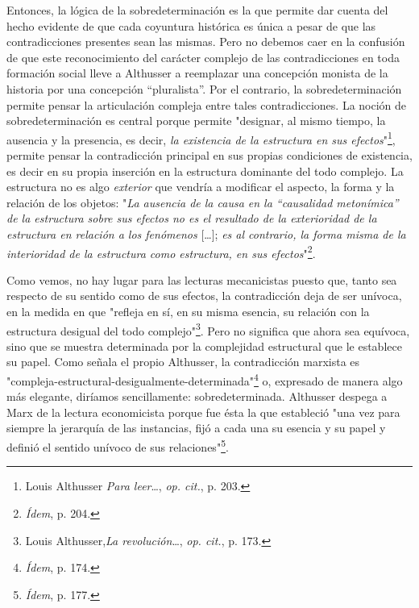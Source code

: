 \documentclass{book}
\begin{document}
Entonces, la lógica de la sobredeterminación es la que permite dar
cuenta del hecho evidente de que cada coyuntura histórica es única a
pesar de que las contradicciones presentes sean las mismas. Pero no
debemos caer en la confusión de que este reconocimiento del carácter
complejo de las contradicciones en toda formación social lleve a
Althusser a reemplazar una concepción monista de la historia por una
concepción ``pluralista''. Por el contrario, la sobredeterminación
permite pensar la articulación compleja entre tales contradicciones. La
noción de sobredeterminación es central porque permite "designar, al
mismo tiempo, la ausencia y la presencia, es decir, \emph{la existencia
de la estructura en sus efectos}"\footnote{Louis Althusser \emph{Para
  leer}\ldots, \emph{op. cit.}, p. 203.}, permite pensar la
contradicción principal en sus propias condiciones de existencia, es
decir en su propia inserción en la estructura dominante del todo
complejo. La estructura no es algo \emph{exterior} que vendría a
modificar el aspecto, la forma y la relación de los objetos: "\emph{La
ausencia de la causa en la ``causalidad metonímica'' de la estructura
sobre sus efectos no es el resultado de la exterioridad de la estructura
en relación a los fenómenos} {[}\ldots{]}; \emph{es al contrario, la
forma misma de la interioridad de la estructura como estructura, en sus
efectos}"\footnote{\emph{Ídem}, p. 204.}.

Como vemos, no hay lugar para las lecturas mecanicistas puesto que,
tanto sea respecto de su sentido como de sus efectos, la contradicción
deja de ser unívoca, en la medida en que "refleja en sí, en su misma
esencia, su relación con la estructura desigual del todo
complejo"\footnote{Louis Althusser,\emph{La revolución}\ldots, \emph{op.
  cit.}, p. 173.}. Pero no significa que ahora sea equívoca, sino que se
muestra determinada por la complejidad estructural que le establece su
papel. Como señala el propio Althusser, la contradicción marxista es
"compleja-estructural-desigualmente-determinada"\footnote{\emph{Ídem},
  p. 174.} o, expresado de manera algo más elegante, diríamos
sencillamente: sobredeterminada. Althusser despega a Marx de la lectura
economicista porque fue ésta la que estableció "una vez para siempre la
jerarquía de las instancias, fijó a cada una su esencia y su papel y
definió el sentido unívoco de sus relaciones"\footnote{\emph{Ídem}, p.
  177.}.
\end{document}
